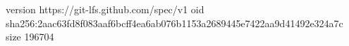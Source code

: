 version https://git-lfs.github.com/spec/v1
oid sha256:2aac63fd8f083aaf6bcff4ea6ab076b1153a2689445e7422aa9d41492e324a7c
size 196704
